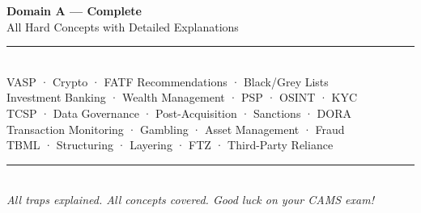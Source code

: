 \documentclass[12pt,aspectratio=169]{beamer}
\begin{document}
	\begin{frame}
		\centering
		\vspace{1.5cm}
		{\fontsize{18}{22}\selectfont \textbf{Domain A — Complete}}\\[0.2cm]
		{\fontsize{11}{13}\selectfont All Hard Concepts with Detailed Explanations}\\[0.1cm]
		\rule{4cm}{0.5pt}\\[0.1cm]
		{\fontsize{8}{10}\selectfont VASP · Crypto · FATF Recommendations · Black/Grey Lists}\\[0.05cm]
		{\fontsize{8}{10}\selectfont Investment Banking · Wealth Management · PSP · OSINT · KYC}\\[0.05cm]
		{\fontsize{8}{10}\selectfont TCSP · Data Governance · Post-Acquisition · Sanctions · DORA}\\[0.05cm]
		{\fontsize{8}{10}\selectfont Transaction Monitoring · Gambling · Asset Management · Fraud}\\[0.05cm]
		{\fontsize{8}{10}\selectfont TBML · Structuring · Layering · FTZ · Third-Party Reliance}\\[0.1cm]
		\rule{4cm}{0.5pt}\\[0.1cm]
		{\fontsize{8}{10}\selectfont \textit{All traps explained. All concepts covered. Good luck on your CAMS exam!}}
		\vspace{0.5cm}
	\end{frame}
	
\end{document}
